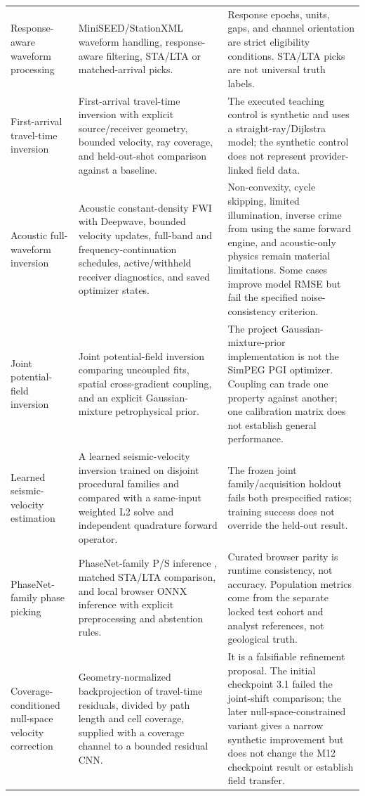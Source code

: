 \begin{center}
\begin{longtable}{@{}>{\raggedright\arraybackslash}p{}>{\raggedright\arraybackslash}p{}>{\raggedright\arraybackslash}p{}@{}}
Response-aware waveform processing & MiniSEED/StationXML waveform handling, response-aware filtering, STA/LTA or matched-arrival picks. & Response epochs, units, gaps, and channel orientation are strict eligibility conditions. STA/LTA picks are not universal truth labels. \\
First-arrival travel-time inversion & First-arrival travel-time inversion with explicit source/receiver geometry, bounded velocity, ray coverage, and held-out-shot comparison against a baseline. & The executed teaching control is synthetic and uses a straight-ray/Dijkstra model; the synthetic control does not represent provider-linked field data. \\
Acoustic full-waveform inversion & Acoustic constant-density FWI with Deepwave, bounded velocity updates, full-band and frequency-continuation schedules, active/withheld receiver diagnostics, and saved optimizer states. & Non-convexity, cycle skipping, limited illumination, inverse crime from using the same forward engine, and acoustic-only physics remain material limitations. Some cases improve model RMSE but fail the specified noise-consistency criterion. \\
Joint potential-field inversion & Joint potential-field inversion comparing uncoupled fits, spatial cross-gradient coupling, and an explicit Gaussian-mixture petrophysical prior. & The project Gaussian-mixture-prior implementation is not the SimPEG PGI optimizer. Coupling can trade one property against another; one calibration matrix does not establish general performance. \\
Learned seismic-velocity estimation & A learned seismic-velocity inversion trained on disjoint procedural families and compared with a same-input weighted L2 solve and independent quadrature forward operator. & The frozen joint family/acquisition holdout fails both prespecified ratios; training success does not override the held-out result. \\
PhaseNet-family phase picking & PhaseNet-family P/S inference \cite{zhu2019}, matched STA/LTA comparison, and local browser ONNX inference with explicit preprocessing and abstention rules. & Curated browser parity is runtime consistency, not accuracy. Population metrics come from the separate locked test cohort and analyst references, not geological truth. \\
Coverage-conditioned null-space velocity correction & Geometry-normalized backprojection of travel-time residuals, divided by path length and cell coverage, supplied with a coverage channel to a bounded residual CNN. & It is a falsifiable refinement proposal. The initial checkpoint 3.1 failed the joint-shift comparison; the later null-space-constrained variant gives a narrow synthetic improvement but does not change the M12 checkpoint result or establish field transfer. \\
\bottomrule
\end{longtable}
\end{center}

